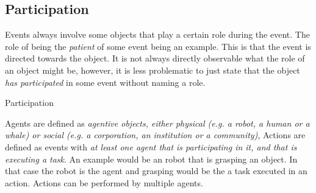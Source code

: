 \subsection{Participation}
\label{sec:participation}
Events always involve some objects that play a certain role during the event. The role of being the \emph{patient} of some event being an example. This is that the event is directed towards the object. It is not always directly observable what the role of an object might be, however, it is less problematic to just state that the object \emph{has participated} in some event without naming a role.

\begin{ODP}{Participation}
\end{ODP}

Agents are defined as \emph{agentive objects, either physical (e.g. a robot, a human or a whale) or social (e.g. a corporation, an institution or a community)}, Actions are defined as events with \emph{at least one agent that is participating in it, and that is executing a task}. An example would be an robot that is grasping an object. In that case the robot is the agent and grasping would be the a task executed in an action. Actions can be performed by multiple agents. 

